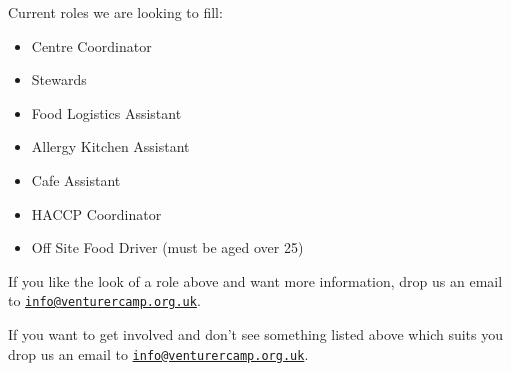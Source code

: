\documentclass[a4paper, 11pt]{report}
\makeatletter
\newcommand{\nl}{\newline}
\newcommand{\infoemail}{\href{mailto:info@venturercamp.org.uk}{\texttt{info@venturercamp.org.uk}}}
\makeatother
\begin{document}
Current roles we are looking to fill:
\begin{itemize}
    \item Centre Coordinator
    \item Stewards
    \item Food Logistics Assistant
    \item Allergy Kitchen Assistant
    \item Cafe Assistant
    \item HACCP Coordinator
    \item Off Site Food Driver (must be aged over 25)
\end{itemize}
If you like the look of a role above and want more information, drop us an email to \infoemail. \nl

If you want to get involved and don't see something listed above which suits you drop us an email to \infoemail. 

\backPage
\end{document}
